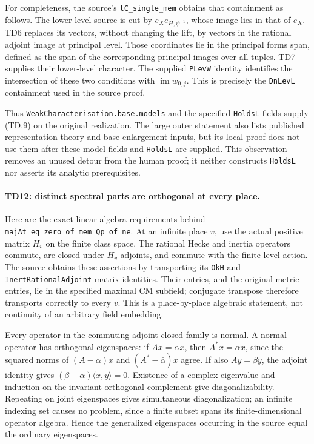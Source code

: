 For completeness, the source's \texttt{tC\_single\_mem} obtains that
containment as follows. The lower-level source is cut by
$e_Xe_{H,\psi^{-1}}$, whose image lies in that of $e_X$. TD6 replaces
its vectors, without changing the lift, by vectors in the rational
adjoint image at principal level. Those coordinates lie in the
principal forms span, defined as the span of the corresponding principal
images over all tuples. TD7 supplies their lower-level character.
The supplied \texttt{PLevW} identity identifies the intersection of
these two conditions with $\operatorname{im}w_{0,j}$. This is precisely
the \texttt{DnLevL} containment used in the source proof.

Thus \texttt{WeakCharacterisation.base.models} and the specified
\texttt{HoldsL} fields supply (TD.9) on the original realization. The
large outer statement also lists published representation-theory and
base-enlargement inputs, but its local proof does not use them after
these model fields and \texttt{HoldsL} are supplied. This observation
removes an unused detour from the human proof; it neither constructs
\texttt{HoldsL} nor asserts its analytic prerequisites.

\paragraph{TD12: distinct spectral parts are orthogonal at every place.}
Here are the exact linear-algebra requirements behind
\texttt{majAt\_eq\_zero\_of\_mem\_Qp\_of\_ne}. At an infinite
place $v$, use the actual positive matrix $H_v$ on the finite class
space. The rational Hecke and inertia operators commute, are closed
under $H_v$-adjoints, and commute with the finite level action. The
source obtains these assertions by transporting its \texttt{OkH} and
\texttt{InertRationalAdjoint} matrix identities. Their entries, and the
original metric entries, lie in the specified maximal CM subfield;
conjugate transpose therefore transports correctly to every $v$.
This is a place-by-place algebraic statement, not continuity of an
arbitrary field embedding.

Every operator in the commuting adjoint-closed family is normal. A
normal operator has orthogonal eigenspaces: if $Ax=\alpha x$, then
$A^*x=\bar\alpha x$, since the squared norms of
$(A-\alpha)x$ and $(A^*-\bar\alpha)x$ agree. If also $Ay=\beta y$,
the adjoint identity gives
$(\beta-\alpha)\langle x,y\rangle=0$.
Existence of a complex eigenvalue and induction on the invariant
orthogonal complement give diagonalizability. Repeating on joint
eigenspaces gives simultaneous diagonalization; an infinite indexing
set causes no problem, since a finite subset spans its finite-dimensional
operator algebra. Hence the generalized eigenspaces occurring in the
source equal the ordinary eigenspaces.

